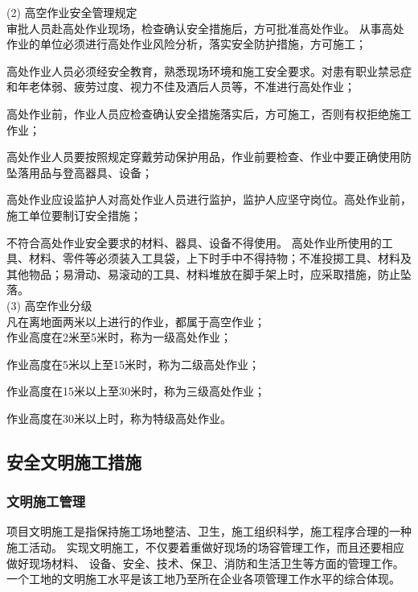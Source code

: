 (2) 高空作业安全管理规定\\

 审批人员赴高处作业现场，检查确认安全措施后，方可批准高处作业。 从事高处作业的单位必须进行高处作业风险分析，落实安全防护措施，方可施工；

 高处作业人员必须经安全教育，熟悉现场环境和施工安全要求。对患有职业禁忌症和年老体弱、疲劳过度、视力不佳及酒后人员等，不准进行高处作业；

 高处作业前，作业人员应检查确认安全措施落实后，方可施工，否则有权拒绝施工作业；

 高处作业人员要按照规定穿戴劳动保护用品，作业前要检查、作业中要正确使用防坠落用品与登高器具、设备； 

 高处作业应设监护人对高处作业人员进行监护，监护人应坚守岗位。高处作业前，施工单位要制订安全措施；

 不符合高处作业安全要求的材料、器具、设备不得使用。
高处作业所使用的工具、材料、零件等必须装入工具袋，上下时手中不得持物；不准投掷工具、材料及其他物品；易滑动、易滚动的工具、材料堆放在脚手架上时，应采取措施，防止坠落。\\

(3) 高空作业分级\\

凡在离地面两米以上进行的作业，都属于高空作业；\\

 作业高度在2米至5米时，称为一级高处作业；

 作业高度在5米以上至15米时，称为二级高处作业；

 作业高度在15米以上至30米时，称为三级高处作业；

 作业高度在30米以上时，称为特级高处作业。\\

\subsection{安全文明施工措施}
\subsubsection{文明施工管理}

项目文明施工是指保持施工场地整洁、卫生，施工组织科学，施工程序合理的一种施工活动。
实现文明施工，不仅要着重做好现场的场容管理工作，而且还要相应做好现场材料、
设备、安全、技术、保卫、消防和生活卫生等方面的管理工作。
一个工地的文明施工水平是该工地乃至所在企业各项管理工作水平的综合体现。

